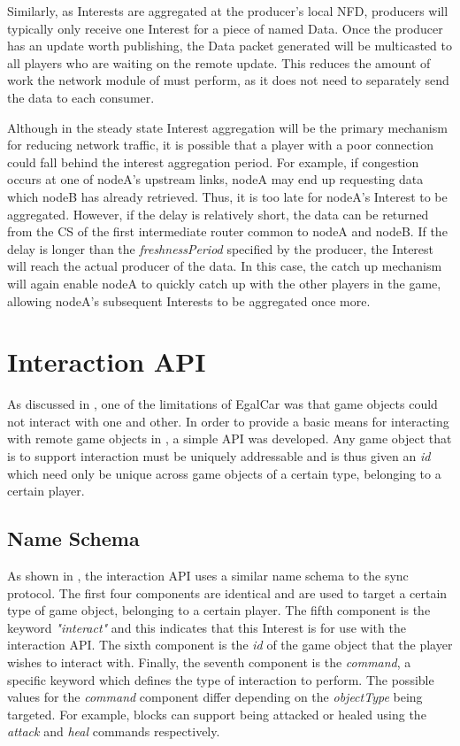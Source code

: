 Similarly, as Interests are aggregated at the producer's local NFD, producers will typically only receive one Interest for a piece of named Data. Once the producer has an update worth publishing, the Data packet generated will be multicasted to all players who are waiting on the remote update. This reduces the amount of work the network module of \game{} must perform, as it does not need to separately send the data to each consumer.

Although in the steady state Interest aggregation will be the primary mechanism for reducing network traffic, it is possible that a player with a poor connection could fall behind the interest aggregation period. For example, if congestion occurs at one of nodeA's upstream links, nodeA may end up requesting data which nodeB has already retrieved. Thus, it is too late for nodeA's Interest to be aggregated. However, if the delay is relatively short, the data can be returned from the CS of the first intermediate router common to nodeA and nodeB. If the delay is longer than the \textit{freshnessPeriod} specified by the producer, the Interest will reach the actual producer of the data. In this case, the catch up mechanism will again enable nodeA to quickly catch up with the other players in the game, allowing nodeA's subsequent Interests to be aggregated once more.




\section{\game{} Interaction API}\label{sec:des:interaction}
As discussed in , one of the limitations of EgalCar was that game objects could not interact with one and other. In order to provide a basic means for interacting with remote game objects in \game{}, a simple API was developed. Any game object that is to support interaction must be uniquely addressable and is thus given an \textit{id} which need only be unique across game objects of a certain type, belonging to a certain player.


\subsection{Name Schema}
As shown in , the interaction API uses a similar name schema to the sync protocol. The first four components are identical and are used to target a certain type of game object, belonging to a certain player. The fifth component is the keyword \textit{"interact"} and this indicates that this Interest is for use with the interaction API. The sixth component is the \textit{id} of the game object that the player wishes to interact with. Finally, the seventh component is the \textit{command}, a specific keyword which defines the type of interaction to perform. The possible values for the \textit{command} component differ depending on the \textit{objectType} being targeted. For example, blocks can support being attacked or healed using the \textit{attack} and \textit{heal} commands respectively.

